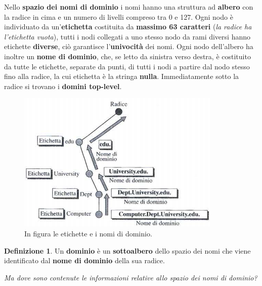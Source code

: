 \documentclass[11pt,a4paper]{article}
\theoremstyle{definition}
\newtheorem{definition}{Definizione}[section]
\begin{document}
Nello \textbf{spazio dei nomi di dominio} i nomi hanno una struttura ad \textbf{albero} con la radice in cima e un numero di livelli compreso tra 0 e 127. Ogni nodo è individuato da un'\textbf{etichetta} costituita da \textbf{massimo 63 caratteri} (\textit{la radice ha l'etichetta vuota}), tutti i nodi collegati a uno stesso nodo da rami diversi hanno etichette \textbf{diverse}, ciò garantisce l'\textbf{univocità} dei nomi. Ogni nodo dell'albero ha inoltre un \textbf{nome di dominio}, che, se letto da sinistra verso destra, è costituito da tutte le etichette, separate da punti, di tutti i nodi a partire dal nodo stesso fino alla radice, la cui etichetta è la stringa \textbf{nulla}. Immediatamente sotto la radice si trovano i \textbf{domini top-level}.
\newpage
\begin{figure}[!h]
	\includegraphics[scale=0.7]{Immagini/Etichette_dns.png}
	\centering
	\caption{In figura le etichette e i nomi di dominio.}
\end{figure}
\theoremstyle{definition}
\begin{definition}
	Un \textbf{dominio} è un \textbf{sottoalbero} dello spazio dei nomi che viene identificato dal \textbf{nome di dominio} della sua radice.
\end{definition}
\textit{Ma dove sono contenute le informazioni relative allo spazio dei nomi di dominio?}
\end{document}
